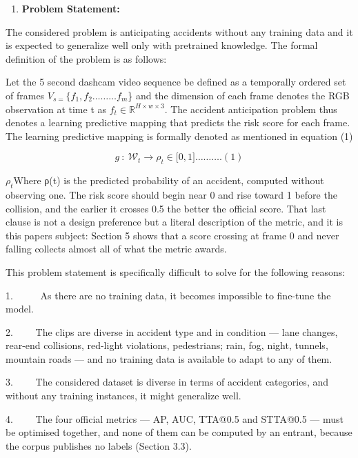 \begin{enumerate}
\def\labelenumi{\arabic{enumi}.}
\item
  \textbf{Problem Statement:}
\end{enumerate}

The considered problem is anticipating accidents without any training data and it is expected to generalize well only with pretrained knowledge. The formal definition of the problem is as follows:

Let the 5 second dashcam video sequence be defined as a temporally ordered set of frames \(V_{s =}\{ f_{1},f_{2}\ldots\ldots\ldots f_{m}\)\} and the dimension of each frame denotes the RGB observation at time t as \(f_{t} \in \mathbb{R}^{H \times w \times 3}\). The accident anticipation problem thus denotes a learning predictive mapping that predicts the risk score for each frame. The learning predictive mapping is formally denoted as mentioned in equation (1)

\[g\ :\ \mathcal{W}_{t} \longrightarrow \rho_{t} \in \lbrack 0,1\rbrack\ldots\ldots\ldots.(1)\]

\(\rho_{t}\)Where ρ(t) is the predicted probability of an accident, computed without observing one. The risk score should begin near 0 and rise toward 1 before the collision, and the earlier it crosses 0.5 the better the official score. That last clause is not a design preference but a literal description of the metric, and it is this paper\textquotesingle s subject: Section 5 shows that a score crossing at frame 0 and never falling collects almost all of what the metric awards.

This problem statement is specifically difficult to solve for the following reasons:

1.~~~~ ~As there are no training data, it becomes impossible to fine-tune the model.

2.~~~~ The clips are diverse in accident type and in condition --- lane changes, rear-end collisions, red-light violations, pedestrians; rain, fog, night, tunnels, mountain roads --- and no training data is available to adapt to any of them.

3.~~~~ The considered dataset is diverse in terms of accident categories, and without any training instances, it might generalize well.

4.~~~~ The four official metrics --- AP, AUC, TTA@0.5 and STTA@0.5 --- must be optimised together, and none of them can be computed by an entrant, because the corpus publishes no labels (Section 3.3).

